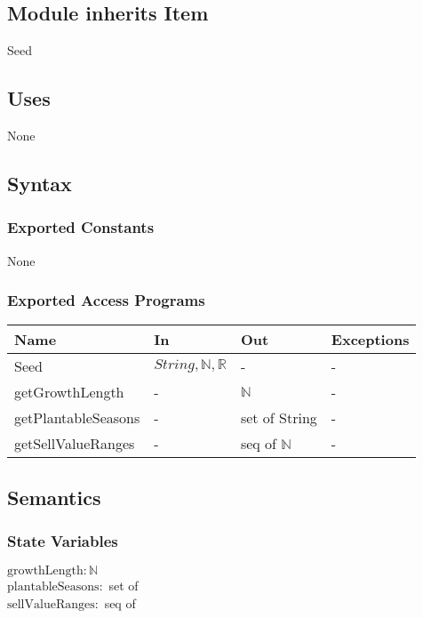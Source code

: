 \documentclass[12pt, titlepage]{article}
\begin{document}
\subsection{Module inherits Item}

Seed

\subsection{Uses}

None

\subsection{Syntax}

\subsubsection{Exported Constants}

None

\subsubsection{Exported Access Programs}

\begin{center}
\begin{tabular}{p{2cm} p{4cm} p{4cm} p{2cm}}
\hline
\textbf{Name} & \textbf{In} & \textbf{Out} & \textbf{Exceptions} \\
\hline
Seed & $String, \mathbb{N}, \mathbb{R}$ & - & - \\
\hline
getGrowthLength & - & $\mathbb{N}$ & - \\
\hline
getPlantableSeasons & - & set of String & - \\
\hline
getSellValueRanges & - & seq of $\mathbb{N}$ & - \\
\hline
\end{tabular}
\end{center}

\subsection{Semantics}

\subsubsection{State Variables}
$\text{growthLength}: \text{$\mathbb{N}$}$\\
$\text{plantableSeasons}:$ set of \\
$\text{sellValueRanges}:$ seq of \\
\end{document}
